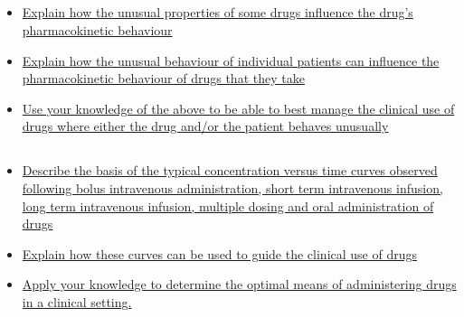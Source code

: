 \documentclass[10pt, a4paper]{article}
\begin{document}
\subsection{} \begin{itemize} \item \href{https://www.notion.so/382898aad24642e7bbe4a6094f0a945a}{Explain how the unusual properties of some drugs influence the drug’s pharmacokinetic behaviour} \item \href{https://www.notion.so/3e3f9b915c264df4aa6f7ae00da78537}{Explain how the unusual behaviour of individual patients can influence the pharmacokinetic behaviour of drugs that they take} \item \href{https://www.notion.so/6f2c0d61468241b69133bba1ea93c7c0}{Use your knowledge of the above to be able to best manage the clinical use of drugs where either the drug and/or the patient behaves unusually} \end{itemize}
\subsection{} \begin{itemize} \item \href{https://www.notion.so/8b55c350de3c42b38755ad48016c8d1b}{Describe the basis of the typical concentration versus time curves observed following bolus intravenous administration, short term intravenous infusion, long term intravenous infusion, multiple dosing and oral administration of drugs} \item \href{https://www.notion.so/fbab835c34fe46e7ac203d1008f8d768}{Explain how these curves can be used to guide the clinical use of drugs} \item \href{https://www.notion.so/52414e8d677d455b8dd7d1408f6cdc0c}{Apply your knowledge to determine the optimal means of administering drugs in a clinical setting.} \end{itemize}
\end{document}
